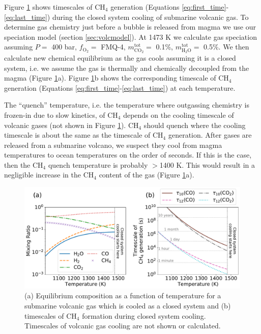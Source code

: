 Figure \ref{fig:kinetics} shows timescales of CH$_4$ generation (Equations \eqref{eq:first_time}-\eqref{eq:last_time}) during the closed system cooling of submarine volcanic gas. To determine gas chemistry just before a bubble is released from magma we use our speciation model (section \ref{sec:volcmodel}). At 1473 K we calculate gas speciation assuming $P =$ 400 bar, $f_\mathrm{O_2} =$ FMQ-4, $m_\mathrm{CO_2}^{\mathrm{tot}} =$ 0.1\%, $m_\mathrm{H_2O}^{\mathrm{tot}} =$ 0.5\%.  We then calculate new chemical equilibrium as the gas cools assuming it is a closed system, i.e. we assume the gas is thermally and chemically decoupled from the magma (Figure \ref{fig:kinetics}a). Figure \ref{fig:kinetics}b shows the corresponding timescale of CH$_4$ generation (Equations \eqref{eq:first_time}-\eqref{eq:last_time}) at each temperature.

The “quench” temperature, i.e. the temperature where outgassing chemistry is frozen-in due to slow kinetics, of CH$_4$ depends on the cooling timescale of volcanic gases (not shown in Figure \ref{fig:kinetics}). CH$_4$ should quench where the cooling timescale is about the same as the timescale of CH$_4$ generation. After gases are released from a submarine volcano, we suspect they cool from magma temperatures to ocean temperatures on the order of seconds. If this is the case, then the CH$_4$ quench temperature is probably $>$1400 K. This would result in a negligible increase in the CH$_4$ content of the gas (Figure \ref{fig:kinetics}a).

\begin{figure}
    \centering
    \includegraphics[width=\textwidth]{tex/3methane/figures/kinetics.pdf}
    \caption{(a) Equilibrium composition as a function of temperature for a submarine volcanic gas which is cooled as a closed system and (b) timescales of CH$_4$ formation during closed system cooling. Timescales of volcanic gas cooling are not shown or calculated.}
    \label{fig:kinetics}
\end{figure}

